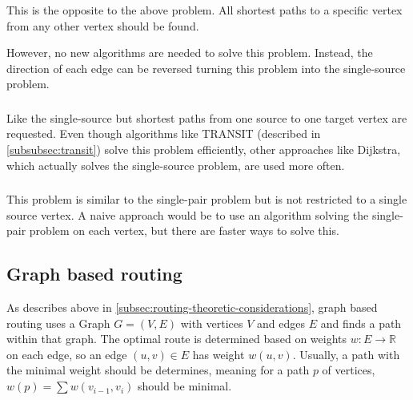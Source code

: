 		\subsubsection{}
		
			This is the opposite to the above problem.
			All shortest paths to a specific vertex from any other vertex should be found.
			
			However, no new algorithms are needed to solve this problem.
			Instead, the direction of each edge can be reversed turning this problem into the single-source problem.
		
		\subsubsection{}
		
			Like the single-source but shortest paths from one source to one target vertex are requested.
			Even though algorithms like TRANSIT (described in \cref{subsubsec:transit}) solve this problem efficiently, other approaches like Dijkstra, which actually solves the single-source problem, are used more often.
		
		\subsubsection{}
		\label{subsubsec:all-pair-shortest-path}
		
			This problem is similar to the single-pair problem but is not restricted to a single source vertex.
			A naive approach would be to use an algorithm solving the single-pair problem on each vertex, but there are faster ways to solve this.

	\subsection{Graph based routing}
		
		As describes above in \cref{subsec:routing-theoretic-considerations}, graph based routing uses a Graph $G=(V, E)$ with vertices $V$ and edges $E$ and finds a path within that graph.
		The optimal route is determined based on weights $w : E \rightarrow \mathbb{R}$ on each edge, so an edge $(u, v) \in E$ has weight $w(u, v)$.
		Usually, a path with the minimal weight should be determines, meaning for a path $p$ of vertices, $w(p) = \sum{w(v_{i-1}, v_i)}$ should be minimal\cite[645]{cormen-introduction-to-alg}.
		
